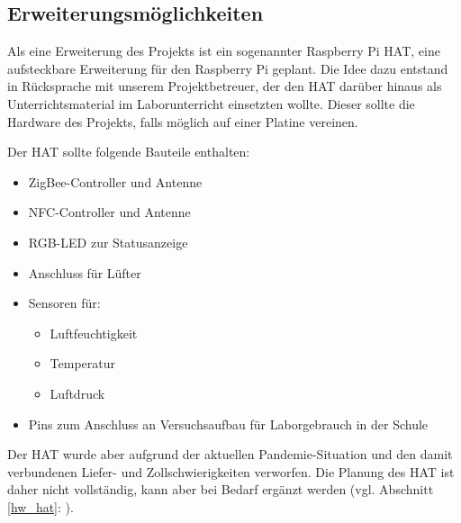 \subsection{Erweiterungsmöglichkeiten}\label{zs_erweiterung}
Als eine Erweiterung des Projekts ist ein sogenannter Raspberry Pi HAT, eine aufsteckbare Erweiterung für den Raspberry Pi geplant.
Die Idee dazu entstand in Rücksprache mit unserem Projektbetreuer, der den HAT darüber hinaus als Unterrichtsmaterial im Laborunterricht einsetzten wollte.
Dieser sollte die Hardware des Projekts, falls möglich auf einer Platine vereinen.\par
\noindent Der HAT sollte folgende Bauteile enthalten:
\begin{itemize}
	\item ZigBee-Controller und Antenne
	\item NFC-Controller und Antenne
	\item RGB-LED zur Statusanzeige
	\item Anschluss für Lüfter
	\item Sensoren für:
	\begin{itemize}
		 \item Luftfeuchtigkeit
		 \item Temperatur
		 \item Luftdruck
	\end{itemize}
	\item Pins zum Anschluss an Versuchsaufbau für Laborgebrauch in der Schule
\end{itemize}
Der HAT wurde aber aufgrund der aktuellen Pandemie-Situation und den damit verbundenen Liefer- und Zollschwierigkeiten verworfen.
Die Planung des HAT ist daher nicht vollständig, kann aber bei Bedarf ergänzt werden (vgl. Abschnitt \ref{hw_hat}: ).